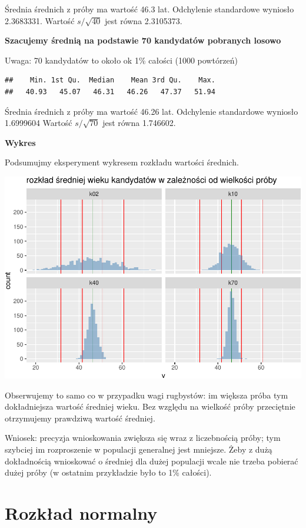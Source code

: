 \documentclass[
  openany]{book}
\begin{document}
Średnia średnich z próby ma wartość 46.3 lat.
Odchylenie standardowe wyniosło 2.3683331.
Wartość \(s/\sqrt{40}\) jest równa 2.3105373.

\textbf{Szacujemy średnią na podstawie 70 kandydatów pobranych losowo}

Uwaga: 70 kandydatów to około ok 1\% całości (1000 powtórzeń)

\begin{verbatim}
##    Min. 1st Qu.  Median    Mean 3rd Qu.    Max. 
##   40.93   45.07   46.31   46.26   47.37   51.94
\end{verbatim}

Średnia średnich z próby ma wartość 46.26 lat.
Odchylenie standardowe wyniosło 1.6999604
Wartość \(s/\sqrt{70}\) jest równa 1.746602.

\textbf{Wykres}

Podsumujmy eksperyment wykresem rozkładu wartości średnich.

\includegraphics{_main_files/figure-latex/unnamed-chunk-34-1.pdf}

Obserwujemy to samo co w przypadku wagi rugbystów: im większa próba tym
dokładniejsza wartość średniej wieku. Bez względu na wielkość próby przeciętnie
otrzymujemy prawdziwą wartość średniej.

Wniosek: precyzja wnioskowania zwiększa się wraz z liczebnością próby; tym szybciej
im rozproszenie w populacji generalnej jest mniejsze. Żeby z dużą dokładnością
wnioskować o średniej dla dużej populacji wcale nie trzeba pobierać
dużej próby (w ostatnim przykładzie było to 1\% całości).

\hypertarget{rozkux142ad-normalny}{%
\section{Rozkład normalny}\label{rozkux142ad-normalny}}
\end{document}
